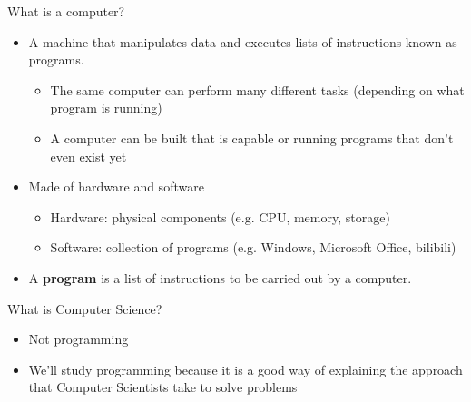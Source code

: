 \documentclass[aspectratio=169]{beamer}
\begin{document}
\begin{frame}{What is a computer?}
    \begin{itemize}[label=--]
        \item A machine that manipulates data and executes lists of instructions known as programs.
            \begin{itemize}[label=\(\blacktriangleright\),itemsep=5pt]
                \item The same computer can perform many different tasks (depending on what program is running)
                \item A computer can be built that is capable or running programs that don't even exist yet
            \end{itemize}
        \item Made of hardware and software
            \begin{itemize}[label=\(\blacktriangleright\),itemsep=5pt]
                \item Hardware: physical components (e.g. CPU, memory, storage)
                \item Software: collection of programs (e.g. Windows, Microsoft Office, bilibili)
            \end{itemize}
        \item A \textbf{program} is a list of instructions to be carried out by a computer.
    \end{itemize}
\end{frame}


\begin{frame}{What is Computer Science?}
    \begin{itemize}[label=--]
        \item Not programming
        \item We'll study programming because it is a good way of explaining the approach that Computer Scientists take to solve problems
    \end{itemize}
\end{frame}
\end{document}
